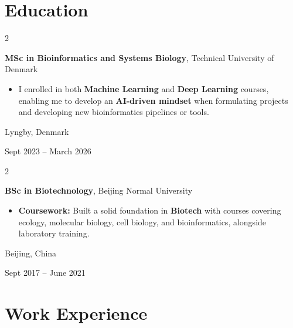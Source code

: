 \documentclass[10pt, letterpaper]{article}
\newenvironment{highlights}{
    \begin{itemize}[
        topsep=0.10 cm,
        parsep=0.10 cm,
        partopsep=0pt,
        itemsep=0pt,
        leftmargin=0.4 cm + 10pt
    ]
}{
    \end{itemize}
}
\newenvironment{twocolentry}[2][]{
    \onecolentry
    \def\secondColumn{#2}
    \setcolumnwidth{\fill, 4.5 cm}
    \begin{paracol}{2}
}{
    \switchcolumn \raggedleft \secondColumn
    \end{paracol}
    \endonecolentry
}
\begin{document}
    \section{Education}

        \begin{twocolentry}{
    Lyngby, Denmark

    Sept 2023 -- March 2026
}
    \textbf{MSc in Bioinformatics and Systems Biology}, Technical University of Denmark
    \begin{highlights}
        \item I enrolled in both \textbf{Machine Learning} and \textbf{Deep Learning} courses, enabling me to develop an \textbf{AI-driven mindset} when formulating projects and developing new bioinformatics pipelines or tools.
    \end{highlights}
\end{twocolentry}

        \vspace{0.3 cm}

\begin{twocolentry}{
    Beijing, China

    Sept 2017 -- June 2021
}
    \textbf{BSc in Biotechnology}, Beijing Normal University
    \begin{highlights}
        \item \textbf{Coursework:} Built a solid foundation in \textbf{Biotech} with courses covering ecology, molecular biology, cell biology, and bioinformatics, alongside laboratory training.
    \end{highlights}
\end{twocolentry}


    \section{Work Experience}
\end{document}

